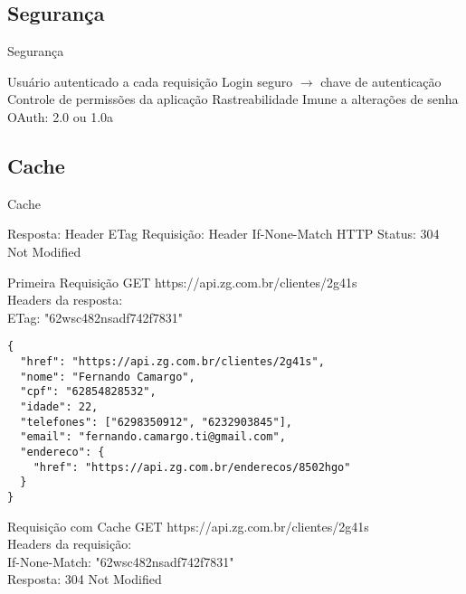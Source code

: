 \documentclass{beamer}
\begin{document}
\subsection{Segurança}

\begin{frame}{Segurança}
  \begin{outline}
     Usuário autenticado a cada requisição
     Login seguro $\rightarrow$ chave de autenticação
       Controle de permissões da aplicação
       Rastreabilidade
       Imune a alterações de senha
     OAuth: 2.0 ou 1.0a
  \end{outline}
\end{frame}

\subsection{Cache}

\begin{frame}{Cache}
  \begin{outline}
     Resposta: Header \alert{ETag}
     Requisição: Header \alert{If-None-Match}
     HTTP Status: 304 Not Modified
  \end{outline}
\end{frame}

\begin{frame}[fragile]{Primeira Requisição}
  GET https://api.zg.com.br/clientes/2g41s\\
  Headers da resposta:\\
  \alert{ETag}: "62wsc482nsadf742f7831"
  \begin{verbatim}
{
  "href": "https://api.zg.com.br/clientes/2g41s",
  "nome": "Fernando Camargo",
  "cpf": "62854828532",
  "idade": 22,
  "telefones": ["6298350912", "6232903845"],
  "email": "fernando.camargo.ti@gmail.com",
  "endereco": {
    "href": "https://api.zg.com.br/enderecos/8502hgo"
  }
}
  \end{verbatim}
\end{frame}

\begin{frame}{Requisição com Cache}
  GET https://api.zg.com.br/clientes/2g41s\\
  Headers da requisição:\\
  \alert{If-None-Match}: "62wsc482nsadf742f7831"\\
  Resposta: \alert{304 Not Modified}
\end{frame}
\end{document}
